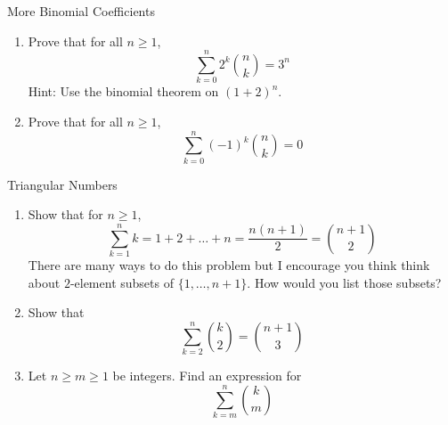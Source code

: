 \documentclass[12pt,letterpaper]{article}
\begin{document}
\begin{problem}{More Binomial Coefficients}
  \begin{enumerate}
    \item Prove that for all \(n\ge1\), \[
      \sum_{k=0}^n 2^k \binom{n}{k} = 3^n
    \]
    Hint: Use the binomial theorem on \((1+2)^n\).
    \item Prove that for all \(n\ge1\), \[
      \sum_{k=0}^n (-1)^k \binom{n}{k} = 0
    \]
  \end{enumerate}
\end{problem}

\begin{problem}{Triangular Numbers}
  \begin{enumerate}
    \item Show that for \(n\ge1\), \[
      \sum_{k=1}^n k = 1 + 2 + \dots + n = \frac{n(n+1)}{2} = \binom{n+1}{2}
    \]
    There are many ways to do this problem but I encourage you think think
    about \(2\)-element subsets of \(\{1, \dots, n+1\}\). How would you list
    those subsets?
    \item Show that \[
      \sum_{k=2}^n \binom{k}{2} = \binom{n+1}{3}
    \]
    \item Let \(n\ge m\ge 1\) be integers. Find an expression for \[
      \sum_{k=m}^n \binom{k}{m}
    \]
  \end{enumerate}
\end{problem}
\end{document}

